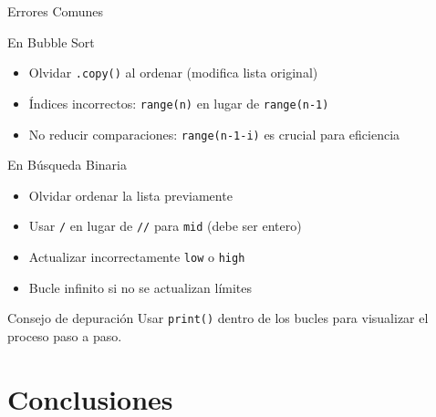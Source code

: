 \documentclass[10pt]{beamer}
\begin{document}
\begin{frame}{Errores Comunes}
  \begin{block}{En Bubble Sort}
    \begin{itemize}
      \item Olvidar \texttt{.copy()} al ordenar (modifica lista original)
      \item Índices incorrectos: \texttt{range(n)} en lugar de \texttt{range(n-1)}
      \item No reducir comparaciones: \texttt{range(n-1-i)} es crucial para eficiencia
    \end{itemize}
  \end{block}
  
  \begin{block}{En Búsqueda Binaria}
    \begin{itemize}
      \item Olvidar ordenar la lista previamente
      \item Usar \texttt{/} en lugar de \texttt{//} para \texttt{mid} (debe ser entero)
      \item Actualizar incorrectamente \texttt{low} o \texttt{high}
      \item Bucle infinito si no se actualizan límites
    \end{itemize}
  \end{block}
  
  \begin{alertblock}{Consejo de depuración}
    Usar \texttt{print()} dentro de los bucles para visualizar el proceso paso a paso.
  \end{alertblock}
\end{frame}

\section{Conclusiones}
\end{document}
